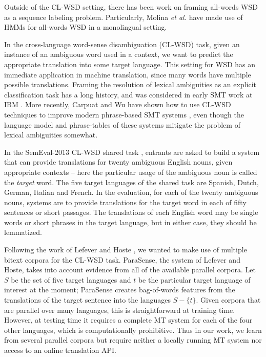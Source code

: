Outside of the CL-WSD setting, there has been work on framing all-words WSD as
a sequence labeling problem. Particularly, Molina \textit{et al.}
 have made use of HMMs for all-words
WSD in a monolingual setting.



In the cross-language word-sense disambiguation (CL-WSD) task, given an
instance of an ambiguous word used in a context, we want to predict the
appropriate translation into some target language. This setting for WSD has an
immediate application in machine translation, since many words have multiple
possible translations. Framing the resolution of lexical ambiguities as an
explicit classification task has a long history, and was considered in early
SMT work at IBM \cite{Brown91word-sensedisambiguation}. More recently, Carpuat
and Wu have shown how to use CL-WSD techniques to improve modern phrase-based
SMT systems \cite{carpuatpsd}, even though the language model and phrase-tables
of these systems mitigate the problem of lexical ambiguities somewhat.

In the SemEval-2013 CL-WSD shared task \cite{task10}, entrants are asked to
build a system that can provide translations for twenty ambiguous English
nouns, given appropriate contexts -- here the particular usage of the ambiguous
noun is called the \emph{target} word. The five target languages of the shared
task are Spanish, Dutch, German, Italian and French. In the evaluation, for
each of the twenty ambiguous nouns, systems are to provide translations for
the target word in each of fifty sentences or short passages. The translations
of each English word may be single words or short phrases in the target
language, but in either case, they should be lemmatized.

Following the work of Lefever and Hoste
, we wanted to make use of
multiple bitext corpora for the CL-WSD task. ParaSense, the system of Lefever
and Hoste, takes into account evidence from all of the available parallel
corpora. Let $S$ be the set of five target languages and $t$ be the particular
target language of interest at the moment; ParaSense creates bag-of-words
features from the translations of the target sentence into the languages $S -
\lbrace{t \rbrace}$. Given corpora that are parallel over many languages, this
is straightforward at training time. However, at testing time it requires a
complete MT system for each of the four other languages, which is
computationally prohibitive. Thus in our work, we learn from several parallel
corpora but require neither a locally running MT system nor access to an online
translation API.

